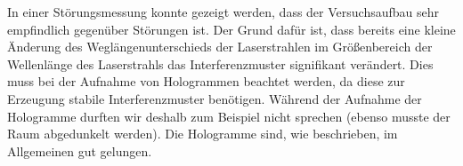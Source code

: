 \documentclass[10pt,a4paper]{article}
\begin{document}
In einer Störungsmessung konnte gezeigt werden, dass der Versuchsaufbau sehr empfindlich gegenüber Störungen ist. Der Grund dafür ist, dass bereits eine kleine Änderung des Weglängenunterschieds der Laserstrahlen im Größenbereich der Wellenlänge des Laserstrahls das Interferenzmuster signifikant verändert. Dies muss bei der Aufnahme von Hologrammen beachtet werden, da diese zur Erzeugung stabile Interferenzmuster benötigen.
Während der Aufnahme der Hologramme durften wir deshalb zum Beispiel nicht sprechen (ebenso musste der Raum abgedunkelt werden). Die Hologramme sind, wie beschrieben, im Allgemeinen gut gelungen.
\end{document}
